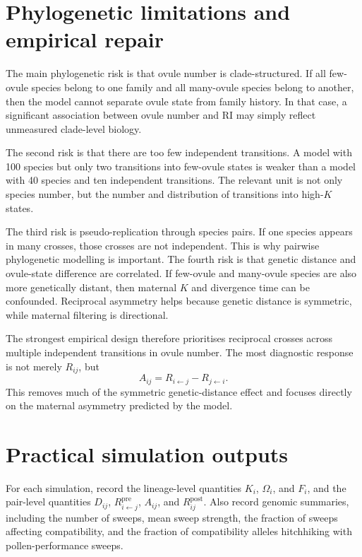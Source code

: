 \documentclass[11pt]{article}
\newcommand{\Rpre}{R^{\mathrm{pre}}}
\newcommand{\Rpost}{R^{\mathrm{post}}}
\begin{document}
\section{Phylogenetic limitations and empirical repair}

The main phylogenetic risk is that ovule number is clade-structured. If all few-ovule species belong to one family and all many-ovule species belong to another, then the model cannot separate ovule state from family history. In that case, a significant association between ovule number and RI may simply reflect unmeasured clade-level biology.

The second risk is that there are too few independent transitions. A model with 100 species but only two transitions into few-ovule states is weaker than a model with 40 species and ten independent transitions. The relevant unit is not only species number, but the number and distribution of transitions into high-\(K\) states.

The third risk is pseudo-replication through species pairs. If one species appears in many crosses, those crosses are not independent. This is why pairwise phylogenetic modelling is important. The fourth risk is that genetic distance and ovule-state difference are correlated. If few-ovule and many-ovule species are also more genetically distant, then maternal \(K\) and divergence time can be confounded. Reciprocal asymmetry helps because genetic distance is symmetric, while maternal filtering is directional.

The strongest empirical design therefore prioritises reciprocal crosses across multiple independent transitions in ovule number. The most diagnostic response is not merely \(R_{ij}\), but
\begin{equation}
A_{ij}=R_{i\leftarrow j}-R_{j\leftarrow i}.
\end{equation}
This removes much of the symmetric genetic-distance effect and focuses directly on the maternal asymmetry predicted by the model.

\section{Practical simulation outputs}

For each simulation, record the lineage-level quantities \(K_i\), \(\Omega_i\), and \(F_i\), and the pair-level quantities \(D_{ij}\), \(\Rpre_{i\leftarrow j}\), \(A_{ij}\), and \(\Rpost_{ij}\). Also record genomic summaries, including the number of sweeps, mean sweep strength, the fraction of sweeps affecting compatibility, and the fraction of compatibility alleles hitchhiking with pollen-performance sweeps.
\end{document}

